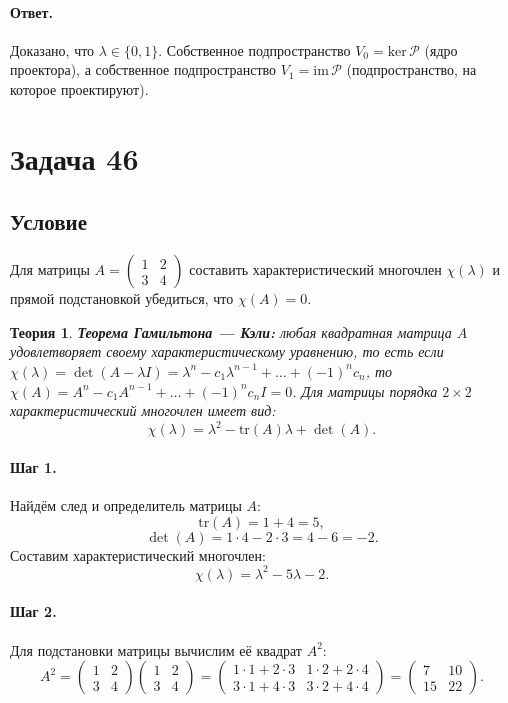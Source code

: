 \documentclass[12pt,a4paper]{article}
\theoremstyle{solution}
\newtheorem*{theory}{Теория}
\newcommand{\task}[1]{\newpage\section*{Задача #1}}
\newcommand{\answer}{\paragraph{Ответ.}}
\newcommand{\step}[1]{\paragraph{Шаг #1.}}
\newcommand{\tr}{\mathrm{tr}}
\begin{document}
\answer
Доказано, что $\lambda \in \{0, 1\}$. Собственное подпространство $V_0 = \mathrm{ker}\,\mathcal{P}$ (ядро проектора), а собственное подпространство $V_1 = \mathrm{im}\,\mathcal{P}$ (подпространство, на которое проектируют).

\task{46}
\subsection*{Условие}
Для матрицы $A = \begin{pmatrix} 1 & 2 \\ 3 & 4 \end{pmatrix}$ составить характеристический многочлен $\chi(\lambda)$ и прямой подстановкой убедиться, что $\chi(A) = 0$.

\begin{theory}
\textbf{Теорема Гамильтона — Кэли:} любая квадратная матрица $A$ удовлетворяет своему характеристическому уравнению, то есть если $\chi(\lambda) = \det(A - \lambda I) = \lambda^n - c_1 \lambda^{n-1} + \dots + (-1)^n c_n$, то $\chi(A) = A^n - c_1 A^{n-1} + \dots + (-1)^n c_n I = 0$.
Для матрицы порядка $2\times2$ характеристический многочлен имеет вид:
\[
\chi(\lambda) = \lambda^2 - \tr(A)\lambda + \det(A).
\]
\end{theory}

\step{1} Найдём след и определитель матрицы $A$:
\[
\tr(A) = 1 + 4 = 5,
\]
\[
\det(A) = 1\cdot 4 - 2\cdot 3 = 4 - 6 = -2.
\]
Составим характеристический многочлен:
\[
\chi(\lambda) = \lambda^2 - 5\lambda - 2.
\]

\step{2} Для подстановки матрицы вычислим её квадрат $A^2$:
\[
A^2 = \begin{pmatrix} 1 & 2 \\ 3 & 4 \end{pmatrix} \begin{pmatrix} 1 & 2 \\ 3 & 4 \end{pmatrix} = \begin{pmatrix} 1\cdot1 + 2\cdot3 & 1\cdot2 + 2\cdot4 \\ 3\cdot1 + 4\cdot3 & 3\cdot2 + 4\cdot4 \end{pmatrix} = \begin{pmatrix} 7 & 10 \\ 15 & 22 \end{pmatrix}.
\]
\end{document}
